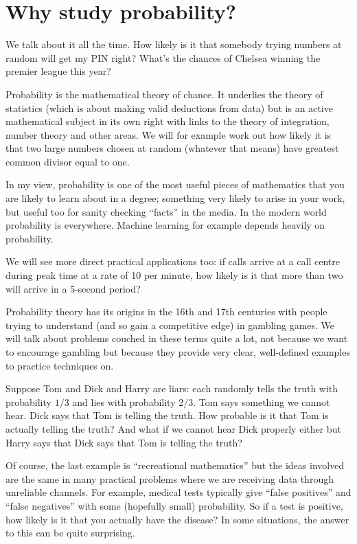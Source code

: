 



\section{Why study probability?} 

We talk about it all the time. How likely is it that somebody trying numbers at random will get my PIN right?   What's the chances of Chelsea winning the premier league this year?  

Probability is the mathematical theory of chance. It underlies the theory of statistics (which is about making valid deductions from data) but is an active mathematical subject in its own right with links to the theory of integration, number theory and other areas. We will for example work out how likely it is that two large numbers chosen at random (whatever that means) have greatest common divisor equal to one. 

In my view, probability is one of the most useful pieces of mathematics that you are likely to learn about in a degree; something very likely to arise in your work, but useful too for sanity checking ``facts'' in the media.  In the modern world probability is everywhere. Machine learning for example depends heavily on probability. 

We will see more direct practical applications too: if calls arrive at a call centre during peak time at a rate of 10 per minute, how likely is it that more than two will arrive in a 5-second period?  

Probability theory has its origins in the 16th and 17th centuries with people trying to understand (and so gain a competitive edge) in gambling games. We will talk about problems couched in these terms quite a lot, not because we want to encourage gambling but because they provide very clear, well-defined examples to practice techniques on. 

 Suppose Tom and Dick and Harry are liars: each randomly tells the truth with probability $1/3$ and lies with probability $2/3$. Tom says something we cannot hear. Dick says that Tom is telling the truth.  How probable is it that Tom is actually telling the truth?   And what if we cannot hear Dick properly either but Harry says that Dick says that Tom is telling the truth?   
 
 Of course, the last example is  ``recreational mathematics'' but the ideas involved are the same in many practical problems where we are receiving data through unreliable channels. For example, medical tests typically give ``false positives'' and ``false negatives'' with some (hopefully small) probability. So if a test is positive, how likely is it that you actually have the disease?  In some situations, the answer to this can be quite surprising. 







